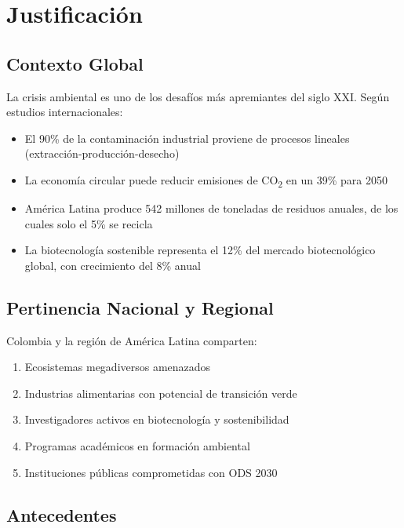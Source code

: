 \documentclass[12pt,a4paper]{article}
\begin{document}
\section{Justificación}

\subsection{Contexto Global}

La crisis ambiental es uno de los desafíos más apremiantes del siglo XXI. Según estudios internacionales:

\begin{itemize}[label={\textcolor{verdelimpio}{\textbullet}}]
  \item El 90\% de la contaminación industrial proviene de procesos lineales (extracción-producción-desecho)
  \item La economía circular puede reducir emisiones de CO\textsubscript{2} en un 39\% para 2050
  \item América Latina produce 542 millones de toneladas de residuos anuales, de los cuales solo el 5\% se recicla
  \item La biotecnología sostenible representa el 12\% del mercado biotecnológico global, con crecimiento del 8\% anual
\end{itemize}

\subsection{Pertinencia Nacional y Regional}

Colombia y la región de América Latina comparten:

\begin{enumerate}[label={\textcolor{verdeosc}{\arabic{*}.}}]
  \item Ecosistemas megadiversos amenazados
  \item Industrias alimentarias con potencial de transición verde
  \item Investigadores activos en biotecnología y sostenibilidad
  \item Programas académicos en formación ambiental
  \item Instituciones públicas comprometidas con ODS 2030
\end{enumerate}

\subsection{Antecedentes}
\end{document}
